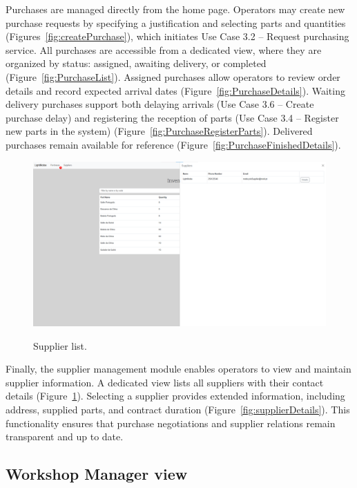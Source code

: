 Purchases are managed directly from the home page. Operators may create new purchase requests by specifying a justification and selecting parts and quantities (Figures~\ref{fig:createPurchase}), which initiates Use Case 3.2 – Request purchasing service. All purchases are accessible from a dedicated view, where they are organized by status: assigned, awaiting delivery, or completed (Figure~\ref{fig:PurchaseList}). Assigned purchases allow operators to review order details and record expected arrival dates (Figure~\ref{fig:PurchaseDetails}). Waiting delivery purchases support both delaying arrivals (Use Case 3.6 – Create purchase delay) and registering the reception of parts (Use Case 3.4 – Register new parts in the system) (Figure~\ref{fig:PurchaseRegisterParts}). Delivered purchases remain available for reference (Figure~\ref{fig:PurchaseFinishedDetails}).


\begin{figure}[h]
  \caption{Supplier list.}
  \centering
  \includegraphics[width=\textwidth]{figs/Implementation/warehouse/supplierList}
  \label{fig:supplierList}
\end{figure}



Finally, the supplier management module enables operators to view and maintain supplier information. A dedicated view lists all suppliers with their contact details (Figure~\ref{fig:supplierList}). Selecting a supplier provides extended information, including address, supplied parts, and contract duration (Figure~\ref{fig:supplierDetails}). This functionality ensures that purchase negotiations and supplier relations remain transparent and up to date.

\subsection{Workshop Manager view}


